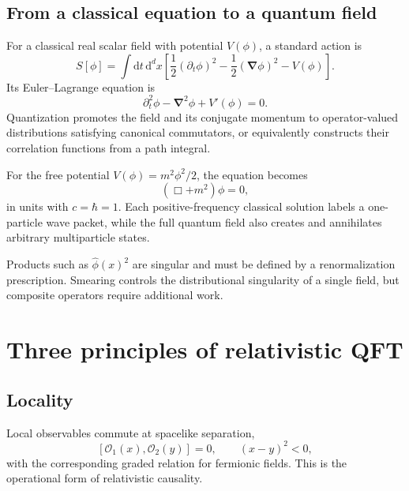\documentclass[11pt]{article}
\newcommand{\dd}{\mathrm{d}}
\newcommand{\cO}{\mathcal{O}}
\newcommand{\comm}[2]{\left[#1,#2\right]}
\begin{document}
\subsection{From a classical equation to a quantum field}

For a classical real scalar field with potential $V(\phi)$, a standard
action is
\begin{equation}
  S[\phi]
  =\int\dd t\,\dd^d x\left[
    \frac12(\partial_t\phi)^2
    -\frac12(\bm\nabla\phi)^2
    -V(\phi)
  \right].
\end{equation}
Its Euler--Lagrange equation is
\begin{equation}
  \partial_t^2\phi-\bm\nabla^2\phi+V'(\phi)=0.
  \label{eq:classicalEOM}
\end{equation}
Quantization promotes the field and its conjugate momentum to
operator-valued distributions satisfying canonical commutators, or
equivalently constructs their correlation functions from a path integral.

For the free potential $V(\phi)=m^2\phi^2/2$, the equation becomes
\begin{equation}
  (\Box+m^2)\phi=0,
\end{equation}
in units with $c=\hbar=1$.  Each positive-frequency classical solution
labels a one-particle wave packet, while the full quantum field also creates
and annihilates arbitrary multiparticle states.

\begin{warningbox}
Products such as $\hat\phi(x)^2$ are singular and must be defined by a
renormalization prescription.  Smearing controls the distributional
singularity of a single field, but composite operators require additional
work.
\end{warningbox}

\section{Three principles of relativistic QFT}

\subsection{Locality}

Local observables commute at spacelike separation,
\begin{equation}
  \comm{\cO_1(x)}{\cO_2(y)}=0,
  \qquad (x-y)^2<0,
\end{equation}
with the corresponding graded relation for fermionic fields.  This is the
operational form of relativistic causality.
\end{document}
